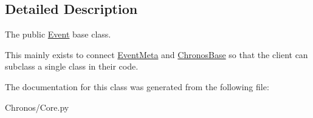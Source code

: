 \subsection{Detailed Description}
The public \hyperlink{classChronos_1_1Core_1_1Event}{Event} base class. 

This mainly exists to connect \hyperlink{classChronos_1_1Core_1_1EventMeta}{Event\+Meta} and \hyperlink{classChronos_1_1Core_1_1ChronosBase}{Chronos\+Base} so that the client can subclass a single class in their code. 

The documentation for this class was generated from the following file\+:\begin{DoxyCompactItemize}
\item 
Chronos/Core.\+py\end{DoxyCompactItemize}
